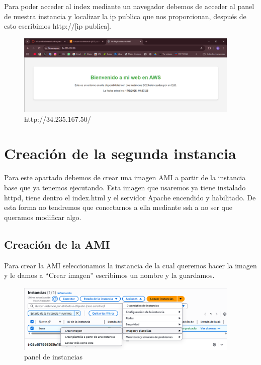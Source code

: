\documentclass{article}
\begin{document}
	Para poder acceder al index mediante un navegador debemos de acceder al panel de nuestra instancia y localizar la ip publica que nos proporcionan, después de esto escribimos http://[ip publica].

	\begin{figure}[H]
	\centering
	\includegraphics[width=0.95\textwidth]{index.png}
	\caption{http://34.235.167.50/}
	\end{figure}



\newpage


\section{Creación de la segunda instancia}

	Para este apartado debemos de crear una imagen AMI a partir de la instancia base que ya tenemos ejecutando. Esta imagen que usaremos ya tiene instalado httpd, tiene dentro el index.html y el servidor Apache encendido y habilitado. De esta forma no tendremos que conectarnos a ella mediante ssh a no ser que queramos modificar algo.

\subsection{Creación de la AMI}

	Para crear la AMI seleccionamos la instancia de la cual queremos hacer la imagen y le damos a ``Crear imagen'' escribimos un nombre y la guardamos.

	

	\begin{figure}[H]
	\centering
	\includegraphics[width=0.95\textwidth]{crear_imagen.png}
	\caption{panel de instancias}
	\end{figure}
\end{document}
